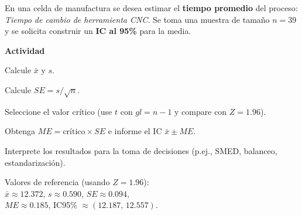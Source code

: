 \begin{ejercicio}[Tiempo de cambio de herramienta CNC (n=39)]
En una celda de manufactura se desea estimar el \textbf{tiempo promedio} del proceso: \emph{Tiempo de cambio de herramienta CNC}.
Se toma una muestra de tamaño $n=39$ y se solicita construir un \textbf{IC al 95\%} para la media.


\textbf{Actividad}
\begin{pasos}
  \item Calcule $\bar{x}$ y $s$.
  \item Calcule $SE = s/\sqrt{n}$.
  \item Seleccione el valor crítico (use $t$ con $gl=n-1$ y compare con $Z=1.96$).
  \item Obtenga $ME=\text{crítico}\times SE$ e informe el IC $\bar{x}\pm ME$.
  \item Interprete los resultados para la toma de decisiones (p.ej., SMED, balanceo, estandarización).
\end{pasos}

\begin{clave}
\noindent Valores de referencia (usando $Z=1.96$):\\
$\bar{x} \approx 12.372$, \quad $s \approx 0.590$, \quad $SE \approx 0.094$,\\
$ME \approx 0.185$, \quad IC95\% $\approx (12.187,\, 12.557)$.
\end{clave}
\end{ejercicio}


